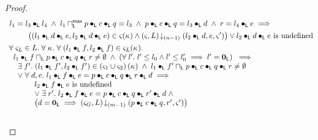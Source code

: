 \begin{lemma}[]
\begin{proof}
\begin{align}
	& \hspace*{0.2cm} l_1 = l_3 \composeL l_4 \;\land\; l_1 \maxMeetL p \composeL c \composeL q = l_3 \;\land\; p \composeL c \composeL q = l_3 \composeL d \;\land\; r = l_4 \composeL e \implies \nonumber\\
	&\hspace*{1cm} \left((l_1 \composeL d \composeL e, l_2 \composeL d \composeL e) \in \amod{}(\ca{}) \land
	\extendsAMUpto{\amod{}, L}{(n-1)}{l_2 \composeL d}{e}{\amod{}'}\right) \lor l_2 \composeL d \composeL e \text{ is undefined} \label{LM:Goal1}\\
%
	&\begin{array}{l}
		\for{\amod{L} \in L} \for{\ca{}} \for{(l_1 \composeL f, l_2 \composeL f) \in \amod{L}(\ca{})} \\
  \hspace*{0.2cm} l_1 \composeL f \meetL p \composeL c \composeL q \composeL r \not= \emptyset \;\land\; \left(\for{l'} l' \leq l_0 \land l' \leq l'_0 \implies l' = \unitL\right)  \;\implies\\
  \hspace*{0.4cm}\exsts{f'} (l_1 \composeL f', l_2 \composeL f') \in \left(\amod{1} \cup \amod{2}\right)(\ca{}) \;\land\; l_1 \composeL f' \meetL p \composeL c \composeL q \composeL r \not= \emptyset\\
		\hspace*{0.4cm}\lor\;\for{d, e}  l_1 \composeL f \composeL e = p \composeL c \composeL q \composeL r \composeL d \implies\\
		\hspace*{1cm}
		\begin{array}{l l}
			l_2 \composeL f \composeL e \text{ is undefined}\\
			\lor\; \exsts{r'} l_2 \composeL f \composeL e = p \composeL c \composeL q \composeL r' \composeL d \;\land\\ \left( d = \unitL \implies \extendsAMUpto{\amod{G}, L}{(m-1)}{p \composeL c \composeL q}{r'}{\amod{}'}\right)
		\end{array}
	\end{array}\label{LM:Goal2}\\\nonumber
\end{align}
%


\end{proof}
\end{lemma}
